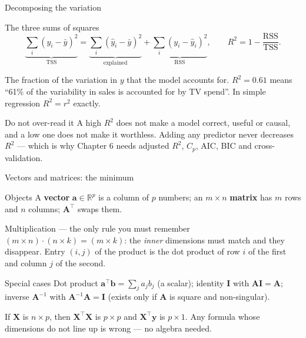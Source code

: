 \documentclass[aspectratio=169,11pt]{beamer}
\begin{document}
\begin{frame}{Decomposing the variation}
  \footnotesize
  \begin{block}{The three sums of squares}
    \[
      \underbrace{\sum_i (y_i - \bar y)^2}_{\mathrm{TSS}}
      = \underbrace{\sum_i (\hat y_i - \bar y)^2}_{\text{explained}}
      + \underbrace{\sum_i (y_i - \hat y_i)^2}_{\mathrm{RSS}},
      \qquad
      R^2 = 1 - \frac{\mathrm{RSS}}{\mathrm{TSS}} .
    \]
  \end{block}
  \begin{readme}
    The fraction of the variation in $y$ that the model accounts for.
    $R^2 = 0.61$ means ``61\% of the variability in sales is accounted for by
    TV spend''. In simple regression $R^2 = r^2$ exactly.
  \end{readme}
  \begin{alertblock}{Do not over-read it}
    A high $R^2$ does not make a model correct, useful or causal, and a low
    one does not make it worthless. Adding any predictor never decreases
    $R^2$ --- which is why Chapter 6 needs adjusted $R^2$, $C_p$, AIC, BIC and
    cross-validation.
  \end{alertblock}
\end{frame}

\begin{frame}{Vectors and matrices: the minimum}
  \footnotesize
  \begin{block}{Objects}
    A \textbf{vector} $\mathbf{a} \in \mathbb{R}^p$ is a column of $p$
    numbers; an $m \times n$ \textbf{matrix} has $m$ rows and $n$ columns;
    $\mathbf{A}^\top$ swaps them.
  \end{block}
  \begin{block}{Multiplication --- the only rule you must remember}
    $(m \times n)\cdot(n \times k) = (m \times k)$: the \emph{inner}
    dimensions must match and they disappear. Entry $(i,j)$ of the product is
    the dot product of row $i$ of the first and column $j$ of the second.
  \end{block}
  \begin{block}{Special cases}
    Dot product $\mathbf{a}^\top\mathbf{b} = \sum_j a_j b_j$ (a scalar);
    identity $\mathbf{I}$ with $\mathbf{A}\mathbf{I} = \mathbf{A}$;
    inverse $\mathbf{A}^{-1}$ with $\mathbf{A}^{-1}\mathbf{A} = \mathbf{I}$
    (exists only if $\mathbf{A}$ is square and non-singular).
  \end{block}
  \begin{takeaway}
    If $\mathbf{X}$ is $n \times p$, then $\mathbf{X}^\top\mathbf{X}$ is
    $p \times p$ and $\mathbf{X}^\top\mathbf{y}$ is $p \times 1$. Any formula
    whose dimensions do not line up is wrong --- no algebra needed.
  \end{takeaway}
\end{frame}
\end{document}
